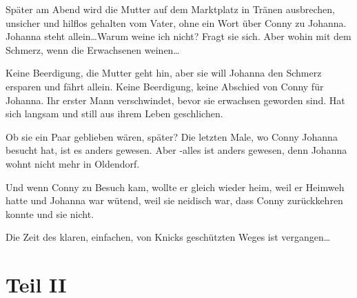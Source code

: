 \documentclass[10pt,a5paper]{book}
\begin{document}
Später am Abend wird die Mutter auf dem Marktplatz in Tränen ausbrechen, unsicher und hilflos gehalten vom Vater, ohne ein Wort über Conny zu Johanna. Johanna steht allein\dots Warum weine ich nicht? Fragt sie sich.
Aber wohin mit  dem Schmerz, wenn die Erwachsenen weinen\dots

Keine Beerdigung, die Mutter geht hin, aber sie will Johanna den Schmerz ersparen und fährt allein. Keine Beerdigung, keine Abschied von Conny für Johanna. Ihr erster Mann verschwindet, bevor sie erwachsen geworden sind. Hat sich langsam und still aus ihrem Leben geschlichen. 

Ob sie ein Paar geblieben wären, später? Die letzten Male, wo Conny Johanna besucht hat, ist es anders gewesen. Aber -alles ist anders gewesen, denn Johanna wohnt nicht mehr in Oldendorf. 

Und wenn Conny zu Besuch kam, wollte er gleich wieder heim, weil er Heimweh hatte und Johanna war wütend, weil sie neidisch war, dass Conny zurückkehren konnte und sie nicht. 

Die Zeit des klaren, einfachen, von Knicks geschützten Weges ist vergangen\dots



\part*{Teil II}

















 
 
 
 
 
 
 
\end{document}
